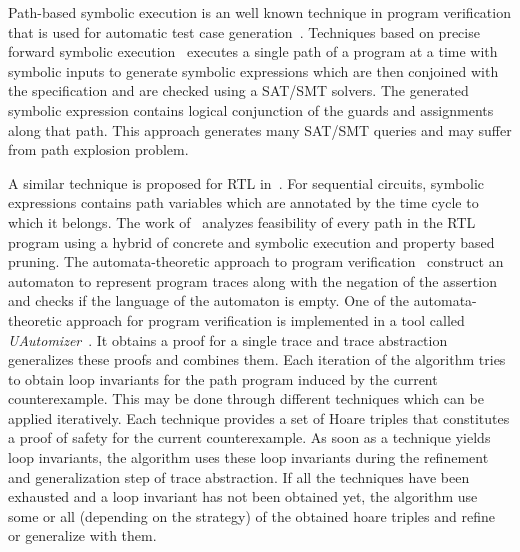 %
Path-based symbolic execution is an well known technique in program verification 
that is used for automatic test case generation~\cite{DBLP:conf/osdi/CadarDE08}.
Techniques based on precise forward symbolic 
execution~\cite{DBLP:conf/osdi/CadarDE08, King:1976:SEP:360248.360252}
executes a single path of a program at a time with symbolic inputs 
to generate symbolic expressions which are then conjoined with
the specification and are checked using a SAT/SMT solvers. 
The generated symbolic expression contains logical conjunction 
of the guards and assignments along that path.  This approach generates many 
SAT/SMT queries and may suffer from path explosion problem.

A similar technique is proposed for RTL in~\cite{star}. 
For sequential circuits, symbolic expressions contains path variables which 
are annotated by the time cycle to which it belongs. The 
work of~\cite{DBLP:journals/todaes/LiuV14} analyzes 
feasibility of every path in the RTL program using a hybrid 
of concrete and symbolic execution and property based pruning.
%
%
The automata-theoretic approach to program verification~\cite{DBLP:conf/cav/HeizmannHP13} construct 
an automaton to represent program traces along with the negation of the assertion and checks if the 
language of the automaton is empty. One of the automata-theoretic approach for program verification 
is implemented in a tool called \emph{UAutomizer}~\cite{DBLP:conf/tacas/HeizmannDGLMSP16}. 
It obtains a proof for a single trace and trace abstraction generalizes 
these proofs and combines them.  Each iteration of the 
algorithm tries to obtain loop invariants for the path program
induced by the current counterexample.  This may be done through different techniques 
which can be applied iteratively. Each technique provides a set of Hoare triples that constitutes a proof of
safety for the current counterexample.
As soon as a technique yields loop invariants, the algorithm uses these loop
invariants during the refinement and generalization step of trace abstraction.  If all the 
techniques have been exhausted and a loop invariant has not been obtained yet, the algorithm
use some or all (depending on the strategy) of the obtained hoare triples and 
refine or generalize with them.



